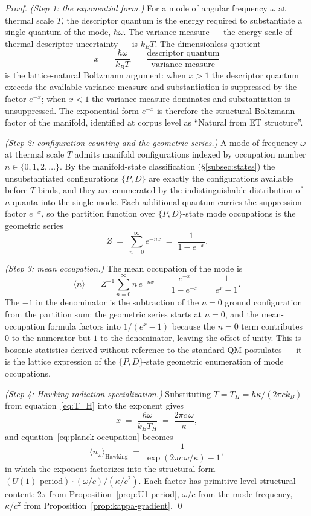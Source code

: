 \documentclass[11pt,a4paper]{article}
\theoremstyle{definition}
\theoremstyle{remark}
\begin{document}
\begin{proof}
\emph{(Step 1: the exponential form.)} For a mode of angular frequency $\omega$ at thermal scale $T$, the descriptor quantum is the energy required to substantiate a single quantum of the mode, $\hbar\omega$. The variance measure --- the energy scale of thermal descriptor uncertainty --- is $k_{B}T$. The dimensionless quotient
\[
x \;=\; \frac{\hbar\omega}{k_{B}T} \;=\; \frac{\text{descriptor quantum}}{\text{variance measure}}
\]
is the lattice-natural Boltzmann argument: when $x > 1$ the descriptor quantum exceeds the available variance measure and substantiation is suppressed by the factor $e^{-x}$; when $x < 1$ the variance measure dominates and substantiation is unsuppressed. The exponential form $e^{-x}$ is therefore the structural Boltzmann factor of the manifold, identified at corpus level as ``Natural from ET structure''.

\emph{(Step 2: configuration counting and the geometric series.)} A mode of frequency $\omega$ at thermal scale $T$ admits manifold configurations indexed by occupation number $n \in \{0,1,2,\ldots\}$. By the manifold-state classification (\S\ref{subsec:states}) the unsubstantiated configurations $\{P,D\}$ are exactly the configurations available before $T$ binds, and they are enumerated by the indistinguishable distribution of $n$ quanta into the single mode. Each additional quantum carries the suppression factor $e^{-x}$, so the partition function over $\{P,D\}$-state mode occupations is the geometric series
\[
Z \;=\; \sum_{n=0}^{\infty} e^{-nx} \;=\; \frac{1}{1 - e^{-x}}.
\]

\emph{(Step 3: mean occupation.)} The mean occupation of the mode is
\[
\langle n\rangle \;=\; Z^{-1}\sum_{n=0}^{\infty} n\,e^{-nx} \;=\; \frac{e^{-x}}{1-e^{-x}} \;=\; \frac{1}{e^{x}-1}.
\]
The $-1$ in the denominator is the subtraction of the $n=0$ ground configuration from the partition sum: the geometric series starts at $n=0$, and the mean-occupation formula factors into $1/(e^{x}-1)$ because the $n=0$ term contributes $0$ to the numerator but $1$ to the denominator, leaving the offset of unity. This is bosonic statistics derived without reference to the standard QM postulates --- it is the lattice expression of the $\{P,D\}$-state geometric enumeration of mode occupations.

\emph{(Step 4: Hawking radiation specialization.)} Substituting $T = T_{H} = \hbar\kappa/(2\pi c k_{B})$ from equation~\eqref{eq:T_H} into the exponent gives
\[
x \;=\; \frac{\hbar\omega}{k_{B}T_{H}} \;=\; \frac{2\pi c\,\omega}{\kappa},
\]
and equation~\eqref{eq:planck-occupation} becomes
\[
\langle n_{\omega}\rangle_{\text{Hawking}} \;=\; \frac{1}{\exp(2\pi c\,\omega/\kappa) - 1},
\]
in which the exponent factorizes into the structural form $(\text{$U(1)$ period}) \cdot (\omega/c) / (\kappa/c^{2})$. Each factor has primitive-level structural content: $2\pi$ from Proposition~\ref{prop:U1-period}, $\omega/c$ from the mode frequency, $\kappa/c^{2}$ from Proposition~\ref{prop:kappa-gradient}. \qed
\end{proof}
\end{document}
